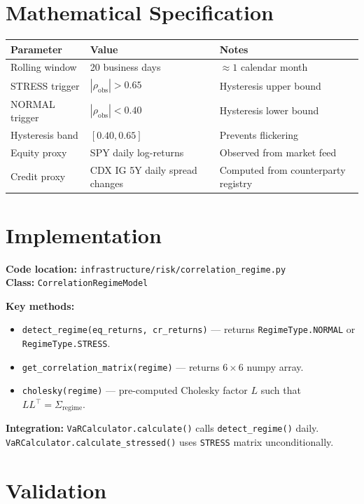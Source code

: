 \documentclass{apex_mdd}
\begin{document}
\section{Mathematical Specification}

\begin{center}
\small
\begin{tabular}{lll}
\toprule
\textbf{Parameter} & \textbf{Value} & \textbf{Notes} \\
\midrule
Rolling window & 20 business days & $\approx 1$ calendar month \\
STRESS trigger & $|\rho_{\mathrm{obs}}| > 0.65$ & Hysteresis upper bound \\
NORMAL trigger & $|\rho_{\mathrm{obs}}| < 0.40$ & Hysteresis lower bound \\
Hysteresis band & $[0.40, 0.65]$ & Prevents flickering \\
Equity proxy & SPY daily log-returns & Observed from market feed \\
Credit proxy & CDX IG 5Y daily spread changes & Computed from counterparty registry \\
\bottomrule
\end{tabular}
\end{center}

\section{Implementation}

\textbf{Code location:} \texttt{infrastructure/risk/correlation\_regime.py}\\
\textbf{Class:} \texttt{CorrelationRegimeModel}

\textbf{Key methods:}
\begin{itemize}
  \item \texttt{detect\_regime(eq\_returns, cr\_returns)} --- returns \texttt{RegimeType.NORMAL} or \texttt{RegimeType.STRESS}.
  \item \texttt{get\_correlation\_matrix(regime)} --- returns $6\times 6$ numpy array.
  \item \texttt{cholesky(regime)} --- pre-computed Cholesky factor $L$ such that $LL^\top = \Sigma_{\mathrm{regime}}$.
\end{itemize}

\textbf{Integration:} \texttt{VaRCalculator.calculate()} calls \texttt{detect\_regime()} daily. \texttt{VaRCalculator.calculate\_stressed()} uses \texttt{STRESS} matrix unconditionally.

\section{Validation}
\end{document}
